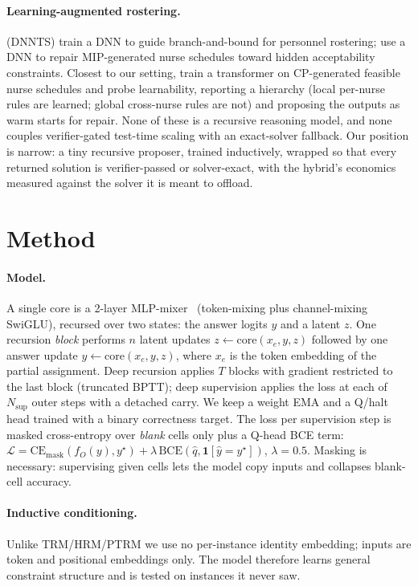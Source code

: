 \documentclass{article}
\begin{document}
\paragraph{Learning-augmented rostering.} \cite{dnnts} (DNNTS) train a DNN to guide
branch-and-bound for personnel rostering; \cite{nurserepair} use a DNN to repair
MIP-generated nurse schedules toward hidden acceptability constraints. Closest to
our setting, \cite{patat} train a transformer on CP-generated feasible nurse
schedules and probe learnability, reporting a hierarchy (local per-nurse rules are
learned; global cross-nurse rules are not) and proposing the outputs as warm
starts for repair. None of these is a recursive reasoning model, and none couples
verifier-gated test-time scaling with an exact-solver fallback. Our position is
narrow: a tiny recursive proposer, trained inductively, wrapped so that every
returned solution is verifier-passed or solver-exact, with the hybrid's economics
measured against the solver it is meant to offload.

\section{Method}
\label{sec:method}

\paragraph{Model.} A single core is a 2-layer MLP-mixer~\cite{mlpmixer}
(token-mixing plus channel-mixing SwiGLU), recursed over two states: the answer
logits $y$ and a latent $z$. One recursion \emph{block} performs $n$ latent updates
$z \leftarrow \mathrm{core}(x_e, y, z)$ followed by one answer update
$y \leftarrow \mathrm{core}(x_e, y, z)$, where $x_e$ is the token embedding of the
partial assignment. Deep recursion applies $T$ blocks with gradient restricted to
the last block (truncated BPTT); deep supervision applies the loss at each of
$N_{\mathrm{sup}}$ outer steps with a detached carry. We keep a weight EMA and a
Q/halt head trained with a binary correctness target. The loss per supervision
step is masked cross-entropy over \emph{blank} cells only plus a Q-head BCE term:
$\mathcal{L} = \mathrm{CE}_{\mathrm{mask}}(f_O(y), y^\star) + \lambda\,
\mathrm{BCE}(\hat q, \mathbf{1}[\hat y = y^\star])$, $\lambda = 0.5$. Masking is
necessary: supervising given cells lets the model copy inputs and collapses
blank-cell accuracy.

\paragraph{Inductive conditioning.} Unlike TRM/HRM/PTRM we use no per-instance
identity embedding; inputs are token and positional embeddings only. The model
therefore learns general constraint structure and is tested on instances it never
saw.
\end{document}
